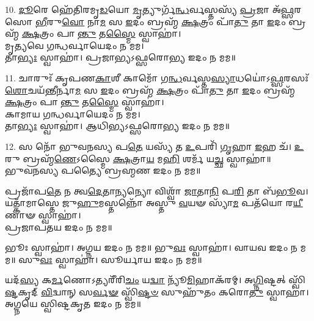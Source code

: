 10. \ul{𑌦𑍂}\-𑌰𑍇 𑌹𑍇᳴𑌤𑌿𑌰𑌮𑍃\-\ul{𑌡}\-𑌯𑍋 \ul{𑌮𑍃}\-𑌤𑍍𑌯𑍁𑌰𑍍𑌗᳴\-\ul{𑌨𑍍𑌧}\-𑌰𑍍𑌵𑌸𑍍𑌤𑌸𑍍𑌯᳴ \ul{𑌪𑍍𑌰}\-𑌜𑌾 𑌅᳴\-\ul{𑌫𑍍𑌸}\-𑌰𑌸𑍋 \ul{𑌭𑍀}\-𑌰𑍁\-\ul{𑌵𑍋} 𑌨𑌾\-\ul{𑌮} 𑌸 \ul{𑌇}\-𑌦𑌂 𑌬𑍍𑌰𑌹𑍍𑌮᳴ \ul{𑌕𑍍𑌷}\-𑌤𑍍𑌰𑌂 𑌪𑌾᳴\-\ul{𑌤𑍁} 𑌤𑌾 \ul{𑌇}\-𑌦𑌂 𑌬𑍍𑌰𑌹𑍍𑌮᳴ \ul{𑌕𑍍𑌷}\-𑌤𑍍𑌰𑌂 𑌪𑌾\-\ul{𑌨𑍍𑌤𑍁} 𑌤\-\ul{𑌸𑍍𑌮𑍈} 𑌸𑍍𑌵𑌾𑌹𑌾॑।\\
𑌮𑍃𑌤𑍍𑌯𑌵𑍇 𑌗𑌨𑍍𑌧𑌰𑍍𑌵𑌾𑌯𑍇𑌦𑌂 𑌨 𑌮𑌮।\\
𑌤𑌾\-\ul{𑌭𑍍𑌯𑌃} 𑌸𑍍𑌵𑌾𑌹𑌾॑। 𑌪𑍍𑌰𑌜𑌾𑌭𑍍𑌯𑌽𑌫𑍍𑌸𑌰𑍋𑌭𑍍𑌯 𑌇𑌦𑌂 𑌨 𑌮𑌮॥

11. 𑌚𑌾𑌰𑍁𑌃᳴ 𑌕𑍃𑌪𑌣\-\ul{𑌕𑌾}\-𑌶𑍀 𑌕𑌾𑌮𑍋᳴ 𑌗\-\ul{𑌨𑍍𑌧}\-𑌰𑍍𑌵𑌸𑍍𑌤\-\ul{𑌸𑍍𑌯𑌾}\-𑌧𑌯𑍋॑𑌽\-\ul{𑌫𑍍𑌸}\-𑌰𑌸𑌃᳴ \ul{𑌶𑍋}\-𑌚𑌯᳴\-\ul{𑌨𑍍𑌤𑍀}\-𑌰𑍍𑌨𑌾\-\ul{𑌮} 𑌸 \ul{𑌇}\-𑌦𑌂 𑌬𑍍𑌰𑌹𑍍𑌮᳴ \ul{𑌕𑍍𑌷}\-𑌤𑍍𑌰𑌂 𑌪𑌾᳴\-\ul{𑌤𑍁} 𑌤𑌾 \ul{𑌇}\-𑌦𑌂 𑌬𑍍𑌰𑌹𑍍𑌮᳴ \ul{𑌕𑍍𑌷}\-𑌤𑍍𑌰𑌂 𑌪𑌾\-\ul{𑌨𑍍𑌤𑍁} 𑌤\-\ul{𑌸𑍍𑌮𑍈} 𑌸𑍍𑌵𑌾𑌹𑌾॑।\\
𑌕𑌾𑌮𑌾𑌯 𑌗𑌨𑍍𑌧𑌰𑍍𑌵𑌾𑌯𑍇𑌦𑌂 𑌨 𑌮𑌮।\\
𑌤𑌾\-\ul{𑌭𑍍𑌯𑌃} 𑌸𑍍𑌵𑌾𑌹𑌾॑। 𑌆𑌧𑌿𑌭𑍍𑌯𑌽𑌫𑍍𑌸𑌰𑍋𑌭𑍍𑌯 𑌇𑌦𑌂 𑌨 𑌮𑌮॥

12. 𑌸 𑌨𑍋᳴ 𑌭𑍁𑌵𑌨𑌸𑍍𑌯 𑌪\-\ul{𑌤𑍇} 𑌯𑌸𑍍𑌯᳴ 𑌤 \ul{𑌉}\-𑌪𑌰𑌿᳴ \ul{𑌗𑍃}\-𑌹𑌾 \ul{𑌇}\-𑌹 𑌚᳴।
\-\ul{𑌉}\-𑌰𑍁 𑌬𑍍𑌰𑌹𑍍𑌮᳴\-\ul{𑌣𑍇}\-𑌽𑌸𑍍𑌮𑍈 \ul{𑌕𑍍𑌷}\-𑌤𑍍𑌰𑌾\-\ul{𑌯} 𑌮\-\ul{𑌹𑌿} 𑌶𑌰𑍍𑌮᳴ 𑌯\-\ul{𑌚𑍍𑌛} 𑌸𑍍𑌵𑌾𑌹𑌾॑॥\\
𑌭𑍁𑌵𑌨𑌸𑍍𑌯 𑌪𑌤𑍍𑌯𑍈 𑌬𑍍𑌰𑌹𑍍𑌮𑌣 𑌇𑌦𑌂 𑌨 𑌮𑌮॥

𑌪𑍍𑌰𑌜𑌾᳴𑌪\-\ul{𑌤𑍇} 𑌨 𑌤𑍍𑌵\-\ul{𑌦𑍇}\-𑌤𑌾\-\ul{𑌨𑍍𑌯}\-𑌨𑍍𑌯𑍋 𑌵𑌿𑌶𑍍𑌵𑌾᳴ \ul{𑌜𑌾}\-𑌤𑌾\-\ul{𑌨𑌿} 𑌪\-\ul{𑌰𑌿} 𑌤𑌾 𑌬᳴\-\ul{𑌭𑍂}\-𑌵।
𑌯𑌤𑍍𑌕𑌾᳴𑌮𑌾𑌸𑍍𑌤𑍇 𑌜𑍁\-\ul{𑌹𑍁}\-𑌮𑌸𑍍𑌤𑌨𑍍𑌨𑍋᳴ 𑌅𑌸𑍍𑌤𑍁 \ul{𑌵}\-𑌯𑍟 𑌸𑍍𑌯𑌾᳴\-\ul{𑌮} 𑌪𑌤᳴𑌯𑍋 𑌰\-\ul{𑌯𑍀}\-𑌣𑌾𑍟 𑌸𑍍𑌵𑌾𑌹𑌾॑।\\
𑌪𑍍𑌰𑌜𑌾𑌪𑌤𑌯 𑌇𑌦𑌂 𑌨 𑌮𑌮॥

𑌭𑍂𑌃 𑌸𑍍𑌵𑌾𑌹𑌾॑। 𑌅𑌗𑍍𑌨𑌯 𑌇𑌦𑌂 𑌨 𑌮𑌮॥
𑌭𑍁\-\ul{𑌵𑌃} 𑌸𑍍𑌵𑌾𑌹𑌾॑। 𑌵𑌾𑌯𑌵 𑌇𑌦𑌂 𑌨 𑌮𑌮॥
𑌸𑍁\-\ul{𑌵𑌃} 𑌸𑍍𑌵𑌾𑌹𑌾॑। 𑌸𑍂𑌰𑍍𑌯𑌾𑌯 𑌇𑌦𑌂 𑌨 𑌮𑌮॥

𑌯𑌦᳴\-\ul{𑌸𑍍𑌯} 𑌕\-\ul{𑌰𑍍𑌮}\-𑌣𑍋𑌽𑌤𑍍𑌯𑌰𑍀᳴𑌰𑌿\-\ul{𑌚𑌂} 𑌯\-\ul{𑌦𑍍𑌵𑌾} 𑌨𑍍𑌯𑍂᳴\-\ul{𑌮𑌿}\-𑌹𑌾𑌕᳴𑌰𑌮𑍍। 𑌅\-\ul{𑌗𑍍𑌨𑌿}\-𑌷𑍍𑌟𑌤𑍍 𑌸𑍍𑌵𑌿᳴\-\ul{𑌷𑍍𑌟}\-𑌕𑍃𑌦𑍍 \ul{𑌵𑌿}\-𑌦𑍍𑌵𑌾𑌨𑍍 𑌸\-\ul{𑌰𑍍𑌵}\-\-\ul{𑍟} 𑌸𑍍𑌵𑌿᳴\-\ul{𑌷𑍍𑌟}\-\-\ul{𑍞} 𑌸𑍁𑌹𑍁᳴𑌤𑌂 𑌕𑌰𑍋\-\ul{𑌤𑍁} 𑌸𑍍𑌵𑌾𑌹𑌾॑। 𑌅𑌗𑍍𑌨𑌯𑍇 𑌸𑍍𑌵𑌿𑌷𑍍𑌟𑌕𑍃𑌤 𑌇𑌦𑌂 𑌨 𑌮𑌮॥
